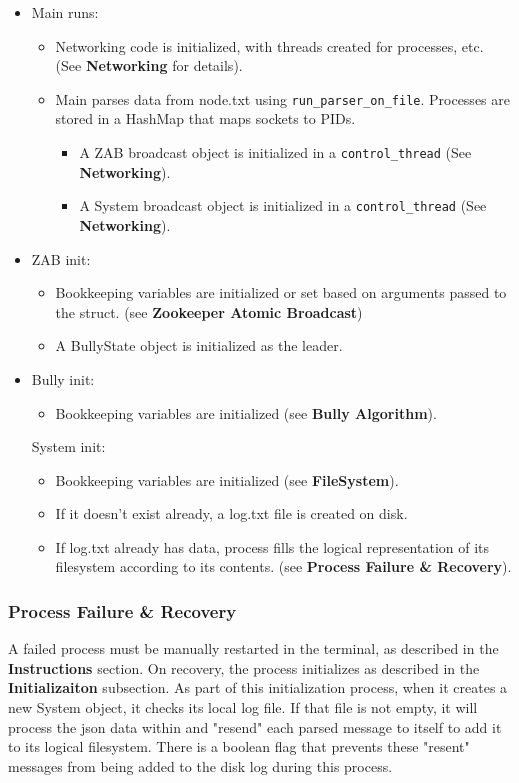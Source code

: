 \documentclass{article}
\begin{document}
\begin{itemize}
	\item
	    Main runs:
	    \begin{itemize}
	    	\item Networking code is initialized, with threads created for processes, etc. (See \textbf{Networking} for details).
	        \item Main parses data from node.txt using \verb|run_parser_on_file|. Processes are stored in a HashMap that maps sockets to PIDs. 
	        \begin{itemize}
	            \item A ZAB broadcast object is initialized in a \verb|control_thread| (See \textbf{Networking}).
	            \item A System broadcast object is initialized in a \verb|control_thread| (See \textbf{Networking}).
	        \end{itemize}
	    \end{itemize}
	\item
	    ZAB init:
	    \begin{itemize}
	    	\item Bookkeeping variables are initialized or set based on arguments passed to the struct. (see \textbf{Zookeeper Atomic Broadcast}) 
	        \item A BullyState object is initialized as the leader.
	    \end{itemize}
	\item
	    Bully init:
	    \begin{itemize}
	        \item Bookkeeping variables are initialized (see \textbf{Bully Algorithm}).
	    \end{itemize}

	    System init:
	    \begin{itemize}
	        \item Bookkeeping variables are initialized (see \textbf{FileSystem}).
	        \item If it doesn't exist already, a log.txt file is created on disk.
	        \item If log.txt already has data, process fills the logical representation of its filesystem according to its contents. (see \textbf{Process Failure & Recovery}).
	    \end{itemize}
	\end{itemize}

    \subsubsection*{Process Failure \& Recovery}
        A failed process must be manually restarted in the terminal, as described in the \textbf{Instructions} section. On recovery, the process initializes as described in the \textbf{Initializaiton} subsection. As part of this initialization process, when it creates a new System object, it checks its local log file. If that file is not empty, it will process the json data within and "resend" each parsed message to itself to add it to its logical filesystem. There is a boolean flag that prevents these "resent" messages from being added to the disk log during this process.
\end{document}

